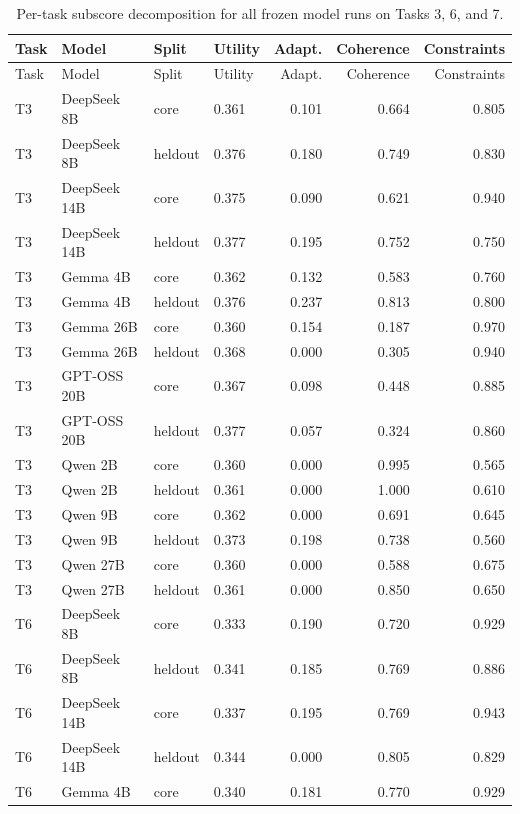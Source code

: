 \begin{longtable}{llllrrr}
\caption{Per-task subscore decomposition for all frozen model runs on Tasks 3, 6, and 7.} \label{tab:subscorelong} \\
\toprule
Task & Model & Split & Utility & Adapt. & Coherence & Constraints \\
\midrule
\endfirsthead
\toprule
Task & Model & Split & Utility & Adapt. & Coherence & Constraints \\
\midrule
\endhead
    T3 & DeepSeek 8B & core & 0.361 & 0.101 & 0.664 & 0.805 \\
    T3 & DeepSeek 8B & heldout & 0.376 & 0.180 & 0.749 & 0.830 \\
    T3 & DeepSeek 14B & core & 0.375 & 0.090 & 0.621 & 0.940 \\
    T3 & DeepSeek 14B & heldout & 0.377 & 0.195 & 0.752 & 0.750 \\
    T3 & Gemma 4B & core & 0.362 & 0.132 & 0.583 & 0.760 \\
    T3 & Gemma 4B & heldout & 0.376 & 0.237 & 0.813 & 0.800 \\
    T3 & Gemma 26B & core & 0.360 & 0.154 & 0.187 & 0.970 \\
    T3 & Gemma 26B & heldout & 0.368 & 0.000 & 0.305 & 0.940 \\
    T3 & GPT-OSS 20B & core & 0.367 & 0.098 & 0.448 & 0.885 \\
    T3 & GPT-OSS 20B & heldout & 0.377 & 0.057 & 0.324 & 0.860 \\
    T3 & Qwen 2B & core & 0.360 & 0.000 & 0.995 & 0.565 \\
    T3 & Qwen 2B & heldout & 0.361 & 0.000 & 1.000 & 0.610 \\
    T3 & Qwen 9B & core & 0.362 & 0.000 & 0.691 & 0.645 \\
    T3 & Qwen 9B & heldout & 0.373 & 0.198 & 0.738 & 0.560 \\
    T3 & Qwen 27B & core & 0.360 & 0.000 & 0.588 & 0.675 \\
    T3 & Qwen 27B & heldout & 0.361 & 0.000 & 0.850 & 0.650 \\
    T6 & DeepSeek 8B & core & 0.333 & 0.190 & 0.720 & 0.929 \\
    T6 & DeepSeek 8B & heldout & 0.341 & 0.185 & 0.769 & 0.886 \\
    T6 & DeepSeek 14B & core & 0.337 & 0.195 & 0.769 & 0.943 \\
    T6 & DeepSeek 14B & heldout & 0.344 & 0.000 & 0.805 & 0.829 \\
    T6 & Gemma 4B & core & 0.340 & 0.181 & 0.770 & 0.929 \\

\end{longtable}
